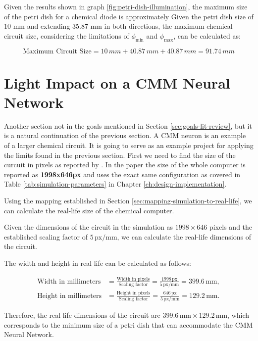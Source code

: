 Given the results shown in graph \ref{fig:petri-dish-illumination}, the maximum size of the petri dish for a chemical diode is approximately 
Given the petri dish size of 10 mm and extending 35.87 mm in both directions, the maximum chemical circuit size, considering the limitations of \( \phi_{\text{min}} \) and \( \phi_{\text{max}} \), can be calculated as:

\[ \text{Maximum Circuit Size} = 10\,mm + 40.87\,mm + 40.87\,mm = 91.74\,mm \]


\section{Light Impact on a CMM Neural Network \citep{stovold2017reaction}} \label{sec:light-impact-cmm-neuron}
Another section not in the goals mentioned in Section \ref{sec:goals-lit-review}, but it is a natural continuation of the previous section.
A CMM neuron is an example of a larger chemical circuit. It is going to serve as an example project for applying the limits found in the previous section.
First we need to find the size of the curcuit in pixels as reported by \cite{stovold2017reaction}. In the paper the 
size of the whole computer is reported as \textbf{1998x646px} and uses the exact same configuration as covered in Table \ref{tab:simulation-parameters} in Chapter \ref{ch:design-implementation}.

Using the mapping established in Section \ref{sec:mapping-simulation-to-real-life}, we can calculate the real-life size of the chemical computer.


Given the dimensions of the circuit in the simulation as $1998 \times 646$ pixels and the established scaling factor of $5 \, \text{px/mm}$, we can calculate the real-life dimensions of the circuit.  

The width and height in real life can be calculated as follows:

\begin{align*}
    \text{Width in millimeters} &= \frac{\text{Width in pixels}}{\text{Scaling factor}} = \frac{1998 \, \text{px}}{5 \, \text{px/mm}} = 399.6 \, \text{mm}, \\
    \text{Height in millimeters} &= \frac{\text{Height in pixels}}{\text{Scaling factor}} = \frac{646 \, \text{px}}{5 \, \text{px/mm}} = 129.2 \, \text{mm}.
\end{align*}
    
Therefore, the real-life dimensions of the circuit are $399.6 \, \text{mm} \times 129.2 \, \text{mm}$, which corresponds to the minimum size of a petri dish that can accommodate the CMM Neural Network.

